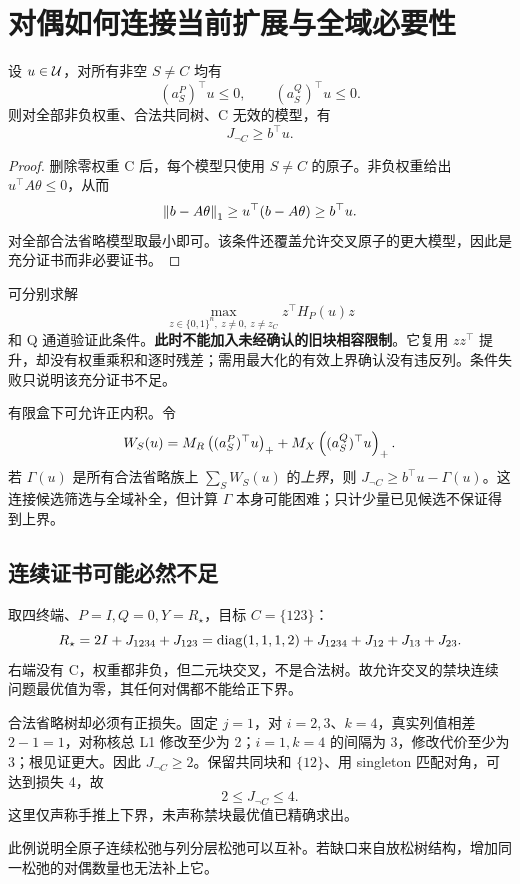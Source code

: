 \section{对偶如何连接当前扩展与全域必要性}
\label{sec:bridge}
\begin{proposition}[不依赖权重上界的完整省略域证书]
设 $u\in\mathcal U$，对所有非空 $S\ne C$ 均有
\begin{equation}
 (a_S^P)^\top u\le0,\qquad(a_S^Q)^\top u\le0.
 \label{eq:globaldual}
\end{equation}
则对全部非负权重、合法共同树、C 无效的模型，有
\begin{equation}
 J_{\neg C}\ge b^\top u.
 \label{eq:globalbound}
\end{equation}
\end{proposition}
\begin{proof}
删除零权重 C 后，每个模型只使用 $S\ne C$ 的原子。非负权重给出 $u^\top A\theta\le0$，从而
\[
 \left\lVert b-A\theta\right\rVert_1\ge u^\top(b-A\theta)\ge b^\top u.
\]
对全部合法省略模型取最小即可。该条件还覆盖允许交叉原子的更大模型，因此是充分证书而非必要证书。
\end{proof}
可分别求解
\begin{equation}
 \max_{z\in\{0,1\}^n,\ z\ne0,\ z\ne z_C}z^\top H_P(u)z
 \label{eq:globalprice}
\end{equation}
和 Q 通道验证此条件。\textbf{此时不能加入未经确认的旧块相容限制}。它复用 $zz^\top$ 提升，却没有权重乘积和逐时残差；需用最大化的有效上界确认没有违反列。条件失败只说明该充分证书不足。

有限盒下可允许正内积。令
\[
 W_S(u)=M_R\left((a_S^P)^\top u\right)_{+}+M_X\left((a_S^Q)^\top u\right)_{+}.
\]
若 $\Gamma(u)$ 是所有合法省略族上 $\sum_SW_S(u)$ 的\emph{上界}，则 $J_{\neg C}\ge b^\top u-\Gamma(u)$。这连接候选筛选与全域补全，但计算 $\Gamma$ 本身可能困难；只计少量已见候选不保证得到上界。

\subsection{连续证书可能必然不足}
\begin{example}[交叉分解使禁块连续松弛为零]
取四终端、$P=I,Q=0,Y=R_\star$，目标 $C=\{123\}$：
\begin{equation}
 R_\star=2I+J_{1234}+J_{123}
 =\operatorname{diag}(1,1,1,2)+J_{1234}+J_{12}+J_{13}+J_{23}.
 \label{eq:crossing}
\end{equation}
右端没有 C，权重都非负，但二元块交叉，不是合法树。故允许交叉的禁块连续问题最优值为零，其任何对偶都不能给正下界。

合法省略树却必须有正损失。固定 $j=1$，对 $i=2,3$、$k=4$，真实列值相差 $2-1=1$，对称核总 L1 修改至少为 2；$i=1,k=4$ 的间隔为 3，修改代价至少为 3；根见证更大。因此 $J_{\neg C}\ge2$。保留共同块和 $\{12\}$、用 singleton 匹配对角，可达到损失 4，故
\begin{equation}
 2\le J_{\neg C}\le4.
 \label{eq:fourbounds}
\end{equation}
这里仅声称手推上下界，未声称禁块最优值已精确求出。
\end{example}
此例说明全原子连续松弛与列分层松弛可以互补。若缺口来自放松树结构，增加同一松弛的对偶数量也无法补上它。

